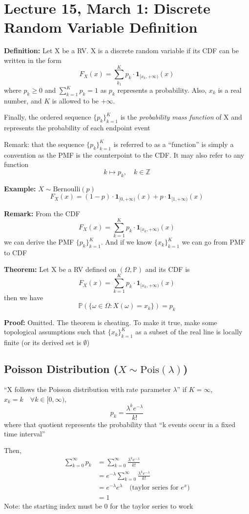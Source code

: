 \documentclass[12pt]{article}
\renewcommand{\P}{\mathbb{P}}
\begin{document}
\section*{Lecture 15, March 1: Discrete Random Variable Definition}
\textbf{Definition:} Let X be a RV. X is a discrete random variable if its CDF can be written in the form 
\[F_X(x) = \sum_{k_1}^K p_k \cdot \mathbf{1}_{[x_k, +\infty)}(x)\]
where $p_k \geq 0$ and $\sum_{k=1}^K p_k = 1$ as $p_k$ represents a probability. Also, $x_k$ is a real number, and $K$ is allowed to be $+\infty$.

Finally, the ordered sequence $\{p_k\}_{k=1}^K$ is the \emph{probability mass function} of X and represents the probability of each endpoint event 

Remark: that the sequence $\{p_k\}_{k=1}^K$ is referred to as a ``function'' is simply a convention as the PMF is the counterpoint to the CDF. It may also refer to any function 
\[k \mapsto p_k, \quad k \in \mathbb{Z}\]

\textbf{Example:} $X \sim \text{Bernoulli}(p)$
\[F_X(x) = (1-p) \cdot \mathbf{1}_{[0, +\infty)}(x) + p\cdot \mathbf{1}_{[1, +\infty)}(x) \]

\textbf{Remark:} From the CDF 
\[F_X(x) = \sum_{k=1}^K p_k \cdot \mathbf{1}_{[x_k, +\infty)}(x)\]
we can derive the PMF $\{p_k\}_{k=1}^K$. And if we know $\{x_k\}_{k=1}^K$ we can go from PMF to CDF

\textbf{Theorem:} Let X be a RV defined on $(\Omega, \P)$ and its CDF is 
\[F_X(x) = \sum_{k=1}^K p_k \cdot \mathbf{1}_{[x_k, +\infty)}(x)\]
then we have 
\[\P(\{\omega \in \Omega : X(\omega) = x_k\}) = p_k\]

\textbf{Proof:} Omitted. The theorem is cheating. To make it true, make some topological assumptions such that $\{x_k\}_{k=1}^K$ as a subset of the real line is locally finite (or its derived set is $\emptyset$)

\subsection*{Poisson Distribution ($X \sim \text{Pois}(\lambda)$)}
``X follows the Poisson distribution with rate parameter $\lambda$'' if $K = \infty$, $x_k = k \quad \forall k \in [0, \infty)$, 
\[p_k = \frac{\lambda^k e^{-\lambda}}{k!}\]
where that quotient represents the probability that ``k events occur in a fixed time interval''

Then,
\begin{align*}
    \sum_{k=0}^\infty p_k &= \sum_{k=0}^\infty \frac{\lambda^k e^{-\lambda}}{k!}\\
    &= e^{-\lambda}\sum_{k=0}^\infty \frac{\lambda^k e^{-\lambda}}{k!}\\
    &= e^{-\lambda} e^{\lambda} \quad \text{(taylor series for $e^x$)}\\
    &= 1
\end{align*}
Note: the starting index must be 0 for the taylor series to work
\end{document}
